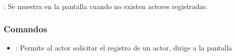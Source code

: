 \begin{Citemize}
	\item {}: Se muestra en la pantalla  cuando no existen actores registradas.
\end{Citemize}


\label{IU8A}
\subsubsection{Comandos}
\begin{itemize}
	\item {}: Permite al actor solicitar el registro de un actor, dirige a la pantalla 
\end{itemize}
